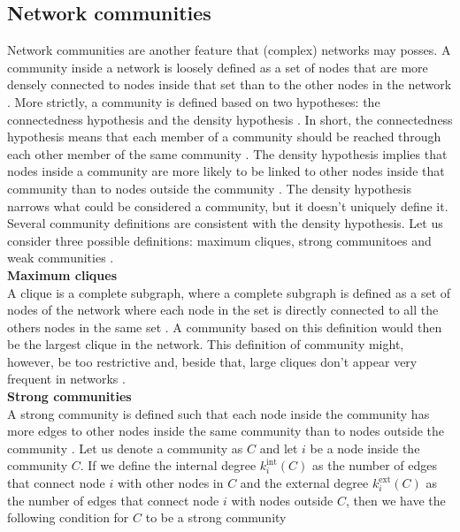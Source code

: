 \documentclass[11 pt , letterpaper , twoside , openright]{book}
\begin{document}
\subsection{Network communities}


Network communities are another feature that (complex) networks may posses. A community inside a network is loosely defined as a set of nodes that are more densely connected to nodes inside that set than to the other nodes in the network \cite{Saha2015}. More strictly, a community is defined based on two hypotheses: the connectedness hypothesis and the density hypothesis \cite{Albert2016}. In short, the connectedness hypothesis means that each member of a community should be reached through each other member of the same community \cite{Albert2016}. The density hypothesis implies that nodes inside a community are more likely to be linked to other nodes inside that community than to nodes outside the community \cite{Albert2016}. The density hypothesis narrows what could be considered a community, but it doesn't uniquely define it. Several community definitions are consistent with the density hypothesis. Let us consider three possible definitions: maximum cliques, strong communitoes and weak communities \cite{Albert2016}.\\
\newline
\textbf{Maximum cliques}\\
\newline
A clique is a complete subgraph, where a complete subgraph is defined as a set of nodes of the network where each node in the set is directly connected to all the others nodes in the same set \cite{Albert2016}. A community based on this definition would then be the largest clique in the network. This definition of community might, however, be too restrictive and, beside that, large cliques don't appear very frequent in networks \cite{Albert2016}.\\   
\newpage
\noindent
\textbf{Strong communities}\\
\newline
A strong community is defined such that each node inside the community has more edges to other nodes inside the same community than to nodes outside the community \cite{Albert2016}. Let us denote a community as $C$ and let $i$ be a node inside the community $C$. If we define the internal degree $k_i^{\textrm{int}}(C)$ as the number of edges that connect node $i$ with other nodes in $C$ and the external degree $k_i^{\textrm{ext}}(C)$ as the number of edges that connect node $i$ with nodes outside $C$, then we have the following condition for $C$ to be a strong community \cite{Albert2016}
\end{document}
